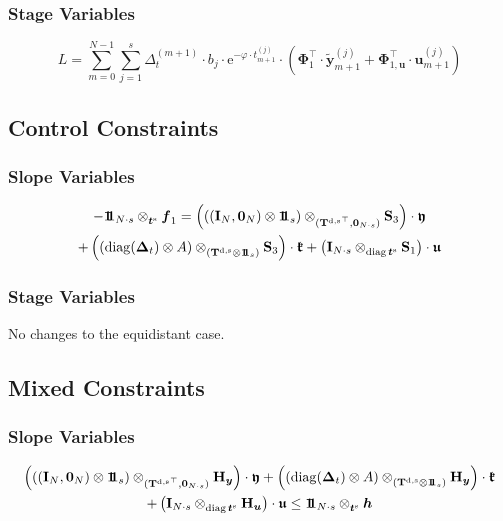 \documentclass{article}
\newcommand{\tp}{\top}%
\newcommand{\kron}{\otimes}%
\newcommand{\dkron}[2][]{\mathbin{\kron_{#2}^{#1}}}%
\newcommand{\expe}{\mathrm{e}}%
\newcommand{\diag}{\mathop{\mathrm{diag}}}%
\newcommand{\vectorfont}[1]{\boldsymbol{#1}}%
\newcommand{\greekvectorfont}[1]{\boldsymbol{#1}}%
\newcommand{\matrixfont}[1]{\mathbf{#1}}%
\newcommand{\fvec}{\vectorfont{f}}
\newcommand{\hvec}{\vectorfont{h}}
\newcommand{\tvec}{\vectorfont{t}}
\newcommand{\uvec}{\vectorfont{u}}
\newcommand{\yvec}{\vectorfont{y}}
\newcommand{\tildeyvec}{\vectorfont{\tilde{y}}}
\newcommand{\Deltavec}{\greekvectorfont{\Delta}}
\newcommand{\Phivec}{\greekvectorfont{\Phi}}
\newcommand{\kfrakvec}{\vectorfont{\mathfrak{k}}}
\newcommand{\ufrakvec}{\vectorfont{\mathfrak{u}}}
\newcommand{\yfrakvec}{\vectorfont{\mathfrak{y}}}
\newcommand{\nullvec}{\greekvectorfont{0}}
\newcommand{\einsvec}{\vectorfont{1}\negthinspace\negthinspace\vectorfont{1}} %
\newcommand{\Hmat}{\matrixfont{H}}
\newcommand{\Imat}{\matrixfont{I}}%
\newcommand{\Smat}{\matrixfont{S}}
\newcommand{\Tmat}{\matrixfont{T}}
\begin{document}
\subsubsection*{Stage Variables}
\[
L = \sum_{m=0}^{N-1} \sum_{j=1}^s \Delta_t^{(m+1)} \cdot b_j \cdot \expe^{-\varphi \cdot t_{m+1}^{(j)}} \cdot \left(\Phivec_1^{\tp} \cdot \tildeyvec_{m+1}^{(j)} + \Phivec_{1,\uvec}^{\tp} \cdot \uvec_{m+1}^{(j)} \right)
\]


\subsection*{Control Constraints}
\subsubsection*{Slope Variables}
\begin{multline*}
-\einsvec_{N\cdot s} \dkron{\tvec^{\mathrm{s}}} \fvec_1
= \left( \left( (\Imat_{N}, \nullvec_N) \kron \einsvec_s\right) \dkron{({\Tmat^{\mathrm{d},\mathrm{s}}}^{\tp},\nullvec_{N \cdot s})} \Smat_3 \right) \cdot \yfrakvec
\\
+ \left(  (\diag(\Deltavec_t) \kron A) \dkron{(\Tmat^{\mathrm{d},\mathrm{s}} \kron \einsvec_s)} \Smat_3 \right)\cdot \kfrakvec
+ \left(\Imat_{N \cdot s} \dkron{\diag \tvec^{\mathrm{s}}} \Smat_1  \right) \cdot \ufrakvec
\end{multline*}

\subsubsection*{Stage Variables}
No changes to the equidistant case.



\subsection*{Mixed Constraints}
\subsubsection*{Slope Variables}
\begin{multline*}
\left( \left( (\Imat_{N}, \nullvec_N) \kron \einsvec_s\right) \dkron{({\Tmat^{\mathrm{d},\mathrm{s}}}^{\tp},\nullvec_{N \cdot s})} \Hmat_{\yvec} \right) \cdot \yfrakvec
+ \left(  (\diag(\Deltavec_t)\kron A) \dkron{(\Tmat^{\mathrm{d},\mathrm{s}} \kron \einsvec_s)} \Hmat_{\yvec} \right)\cdot \kfrakvec
\\
+ \left(\Imat_{N \cdot s} \dkron{\diag \tvec^{\mathrm{s}}} \Hmat_{\uvec}  \right) \cdot \ufrakvec
\leq \einsvec_{N\cdot s} \dkron{\tvec^{\mathrm{s}}} \hvec
\end{multline*}
\end{document}
